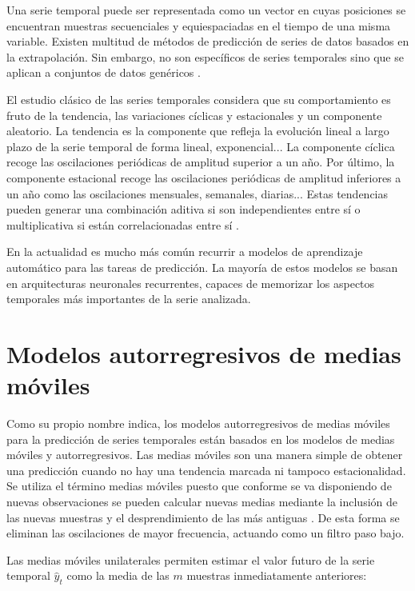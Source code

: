 Una serie temporal puede ser representada como un vector en cuyas posiciones se encuentran muestras secuenciales y equiespaciadas en el tiempo de una misma variable. Existen multitud de métodos de predicción de series de datos basados en la extrapolación. Sin embargo, no son específicos de series temporales sino que se aplican a conjuntos de datos genéricos \cite{seriestemporales}.

El estudio clásico de las series temporales considera que su comportamiento es fruto de la tendencia, las variaciones cíclicas y estacionales y un componente aleatorio. La tendencia es la componente que refleja la evolución lineal a largo plazo de la serie temporal de forma lineal, exponencial... La componente cíclica recoge las oscilaciones periódicas de amplitud superior a un año. Por último, la componente estacional recoge las oscilaciones periódicas de amplitud inferiores a un año como las oscilaciones mensuales, semanales, diarias... Estas tendencias pueden generar una combinación aditiva si son independientes entre sí o multiplicativa si están correlacionadas entre sí \cite{seriestemporales2}.

En la actualidad es mucho más común recurrir a modelos de aprendizaje automático para las tareas de predicción. La mayoría de estos modelos se basan en arquitecturas neuronales recurrentes, capaces de memorizar los aspectos temporales más importantes de la serie analizada.




\section{Modelos autorregresivos de medias móviles}
Como su propio nombre indica, los modelos autorregresivos de medias móviles para la predicción de series temporales están basados en los modelos de medias móviles y autorregresivos. Las medias móviles son una manera simple de obtener una predicción cuando no hay una tendencia marcada ni tampoco estacionalidad. Se utiliza el término medias móviles puesto que conforme se va disponiendo de nuevas observaciones se pueden calcular nuevas medias mediante la inclusión de las nuevas muestras y el desprendimiento de las más antiguas \cite{seriestemporales}. De esta forma se eliminan las oscilaciones de mayor frecuencia, actuando como un filtro paso bajo.

Las medias móviles unilaterales permiten estimar el valor futuro de la serie temporal $\hat{y}_t$ como la media de las $m$ muestras inmediatamente anteriores:

